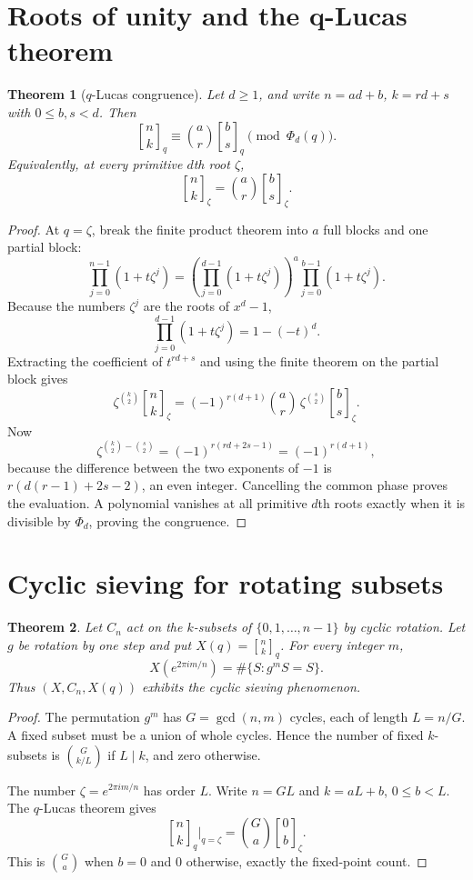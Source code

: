 \documentclass[11pt]{article}
\numberwithin{equation}{section}
\newtheorem{theorem}{Theorem}[section]
\theoremstyle{definition}
\newcommand{\qbinom}[2]{\genfrac{[}{]}{0pt}{}{#1}{#2}_{q}}
\begin{document}
\section{Roots of unity and the q-Lucas theorem}
\begin{theorem}[$q$-Lucas congruence]
Let $d\ge1$, and write $n=ad+b$, $k=rd+s$ with $0\le b,s<d$.  Then
\[
\genfrac{[}{]}{0pt}{}{n}{k}_q
\equiv \binom ar\genfrac{[}{]}{0pt}{}{b}{s}_q
\pmod{\Phi_d(q)}.
\]
Equivalently, at every primitive $d$th root $\zeta$,
\[
\genfrac{[}{]}{0pt}{}{n}{k}_{\zeta}
=\binom ar\genfrac{[}{]}{0pt}{}{b}{s}_{\zeta}.
\]
\end{theorem}
\begin{proof}
At $q=\zeta$, break the finite product theorem into $a$ full blocks and one partial block:
\[
\prod_{j=0}^{n-1}(1+t\zeta^j)
=\left(\prod_{j=0}^{d-1}(1+t\zeta^j)\right)^a
 \prod_{j=0}^{b-1}(1+t\zeta^j).
\]
Because the numbers $\zeta^j$ are the roots of $x^d-1$,
\[
\prod_{j=0}^{d-1}(1+t\zeta^j)=1-(-t)^d.
\]
Extracting the coefficient of $t^{rd+s}$ and using the finite theorem on the partial block gives
\[
\zeta^{\binom{k}{2}}\genfrac{[}{]}{0pt}{}{n}{k}_{\zeta}
=(-1)^{r(d+1)}\binom ar\,
\zeta^{\binom{s}{2}}\genfrac{[}{]}{0pt}{}{b}{s}_{\zeta}.
\]
Now
\[
\zeta^{\binom{k}{2}-\binom{s}{2}}
=(-1)^{r(rd+2s-1)}=(-1)^{r(d+1)},
\]
because the difference between the two exponents of $-1$ is $r(d(r-1)+2s-2)$, an even integer.  Cancelling the common phase proves the evaluation.  A polynomial vanishes at all primitive $d$th roots exactly when it is divisible by $\Phi_d$, proving the congruence.
\end{proof}

\section{Cyclic sieving for rotating subsets}
\begin{theorem}
Let $C_n$ act on the $k$-subsets of $\{0,1,\ldots,n-1\}$ by cyclic rotation.  Let $g$ be rotation by one step and put $X(q)=\qbinom nk$.  For every integer $m$,
\[
X(e^{2\pi i m/n})=\#\{S:g^mS=S\}.
\]
Thus $(X,C_n,X(q))$ exhibits the cyclic sieving phenomenon.
\end{theorem}
\begin{proof}
The permutation $g^m$ has $G=\gcd(n,m)$ cycles, each of length $L=n/G$.  A fixed subset must be a union of whole cycles.  Hence the number of fixed $k$-subsets is $\binom{G}{k/L}$ if $L\mid k$, and zero otherwise.

The number $\zeta=e^{2\pi im/n}$ has order $L$.  Write $n=GL$ and $k=aL+b$, $0\le b<L$.  The $q$-Lucas theorem gives
\[
\qbinom nk\bigg|_{q=\zeta}
=\binom Ga\genfrac{[}{]}{0pt}{}{0}{b}_{\zeta}.
\]
This is $\binom Ga$ when $b=0$ and $0$ otherwise, exactly the fixed-point count.
\end{proof}
\end{document}
